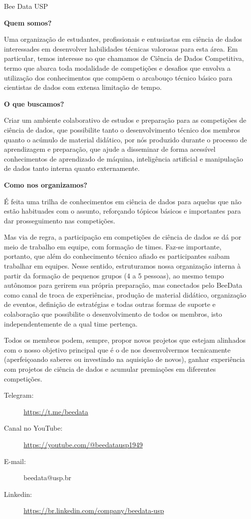 \begin{subsecao}{Bee Data USP}


\textbf{Quem somos?}

Uma organização de estudantes, profissionais e entusiastas em ciência
de dados interessades em desenvolver habilidades técnicas valorosas para
esta área. Em particular, temos interesse no que chamamos de Ciência de
Dados Competitiva, termo que abarca toda modalidade de competições e desafios
que envolva a utilização dos conhecimentos que compõem o arcabouço técnico
básico para cientistas de dados com extensa limitação de tempo.

\textbf{O que buscamos?}

Criar um ambiente colaborativo de estudos e preparação para as competições de
ciência de dados, que possibilite tanto o desenvolvimento técnico dos membros
quanto o acúmulo de material didático, por nós produzido durante o processo de
aprendizagem e preparação, que ajude a disseminar de forma acessível conhecimentos
de aprendizado de máquina, inteligência artificial e manipulação de dados tanto
interna quanto externamente.

\textbf{Como nos organizamos?}

É feita uma trilha de conhecimentos em ciência de dados para aquelus que não
estão habituades com o assunto, reforçando tópicos básicos e importantes para dar
prosseguimento nas competições.

Mas via de regra, a participação em competições de ciência de dados se dá por meio
de trabalho em equipe, com formação de times. Faz-se importante, portanto, que
além do conhecimento técnico afiado es participantes saibam trabalhar em equipes.
Nesse sentido, estruturamos nossa organização interna à partir da formação de
pequenos grupos (4 a 5 pessoas), ao mesmo tempo autônomos para gerirem sua própria
preparação, mas conectados pelo BeeData como canal de troca de experiências, produção
de material didático, organização de eventos, definição de estratégias e todas outras
formas de suporte e colaboração que possibilite o desenvolvimento de todos os membros,
isto independentemente de a qual time pertença.

Todos os membros podem, sempre, propor novos projetos que estejam alinhados com
o nosso objetivo principal que é o de nos desenvolvermos tecnicamente (aperfeiçoando
saberes ou investindo na aquisição de novos), ganhar experiência com projetos de
ciência de dados e acumular premiações em diferentes competições.

\begin{description}
  \item[Telegram:] \url{https://t.me/beedata}
  \item[Canal no YouTube:] \url{https://youtube.com/@beedatausp1949}
  \item[E-mail:] beedata@usp.br
  \item[Linkedin:] \url{https://br.linkedin.com/company/beedata-usp}
\end{description}

\end{subsecao}
